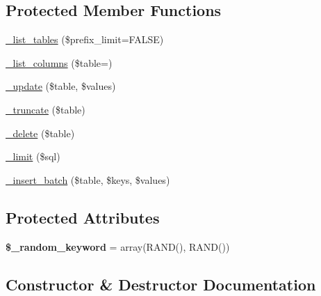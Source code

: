 \subsection*{Protected Member Functions}
\begin{DoxyCompactItemize}
\item 
\mbox{\hyperlink{class_c_i___d_b__pdo__firebird__driver_a6c65282e6bea11304843318c665f29f9}{\+\_\+list\+\_\+tables}} (\$prefix\+\_\+limit=F\+A\+L\+SE)
\item 
\mbox{\hyperlink{class_c_i___d_b__pdo__firebird__driver_a39f58179fa04d1dd0365f9864cd4c9ca}{\+\_\+list\+\_\+columns}} (\$table=\textquotesingle{}\textquotesingle{})
\item 
\mbox{\hyperlink{class_c_i___d_b__pdo__firebird__driver_a9f7924709218086b0b3292e95620675e}{\+\_\+update}} (\$table, \$values)
\item 
\mbox{\hyperlink{class_c_i___d_b__pdo__firebird__driver_a56936c9ecdbe53ea5b5bcfa5a6db0570}{\+\_\+truncate}} (\$table)
\item 
\mbox{\hyperlink{class_c_i___d_b__pdo__firebird__driver_a097073e5bc3b0196d156cb9139682db9}{\+\_\+delete}} (\$table)
\item 
\mbox{\hyperlink{class_c_i___d_b__pdo__firebird__driver_a9a0603085cfcc28727fd823d5f3ac70a}{\+\_\+limit}} (\$sql)
\item 
\mbox{\hyperlink{class_c_i___d_b__pdo__firebird__driver_add25bc0120e2e3d3a4516906f045898b}{\+\_\+insert\+\_\+batch}} (\$table, \$keys, \$values)
\end{DoxyCompactItemize}
\subsection*{Protected Attributes}
\begin{DoxyCompactItemize}
\item 
\mbox{\label{class_c_i___d_b__pdo__firebird__driver_a2c00309040a5f2b6a00518deeca19927}} 
{\bfseries \$\+\_\+random\+\_\+keyword} = array(\textquotesingle{}R\+A\+ND()\textquotesingle{}, \textquotesingle{}R\+A\+ND()\textquotesingle{})
\end{DoxyCompactItemize}


\subsection{Constructor \& Destructor Documentation}
\mbox{\label{class_c_i___d_b__pdo__firebird__driver_abf9eb8714534280f3bb4d8b96d219a34}} 
